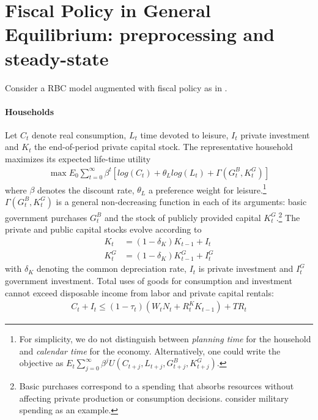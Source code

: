 \section[Fiscal Policy in General Equilibrium: preprocessing and steady-state]{Fiscal Policy in General Equilibrium: preprocessing and steady-state\label{ex:BaxterKingPreprocessSteady}}
Consider a RBC model augmented with fiscal policy as in \textcite{Baxter.King_1993_FiscalPolicyGeneral}.

\paragraph*{Households}
Let $C_t$ denote real consumption, $L_t$ time devoted to leisure, $I_t$ private investment and $K_t$ the end-of-period private capital stock.
The representative household maximizes its expected life-time utility
\begin{align*}
\max E_0 \sum_{t=0}^\infty \beta^t \left[log(C_t)+\theta_L log(L_t) + \Gamma(G_t^B,K_t^G)\right]
\end{align*}
where $\beta$ denotes the discount rate, $\theta_L$ a preference weight for leisure.\footnote{
For simplicity, we do not distinguish between \emph{planning time} for the household and \emph{calendar time} for the economy.
Alternatively, one could write the objective as $E_t \sum_{j=0}^\infty \beta^j U(C_{t+j},L_{t+j},G_{t+j}^B,K_{t+j}^G)$.
}
$\Gamma(G_t^B,K_t^G)$ is a general non-decreasing function in each of its arguments: basic government purchases $G_t^B$
  and the stock of publicly provided capital $K_t^G$.\footnote{
Basic purchases correspond to a spending that absorbs resources without affecting private production or consumption decisions.
\textcite{Baxter.King_1993_FiscalPolicyGeneral} consider military spending as an example.
}
The private and public capital stocks evolve according to
\begin{align}
K_{t} &= (1-\delta_K)K_{t-1} + I_t \label{eq:BaxterKing:PrivateCapital}\\
K_{t}^G &= (1-\delta_K)K_{t-1}^G + I_t^G \label{eq:BaxterKing:PublicCapital}
\end{align}
with $\delta_K$ denoting the common depreciation rate, $I_t$ is private investment and $I_t^G$ government investment.
Total uses of goods for consumption and investment cannot exceed disposable income from labor and private capital rentals:
\begin{align*}
C_t + I_t \leq (1-\tau_t)(W_t N_t + R^K_{t} K_{t-1}) + {TR}_t
\end{align*}
